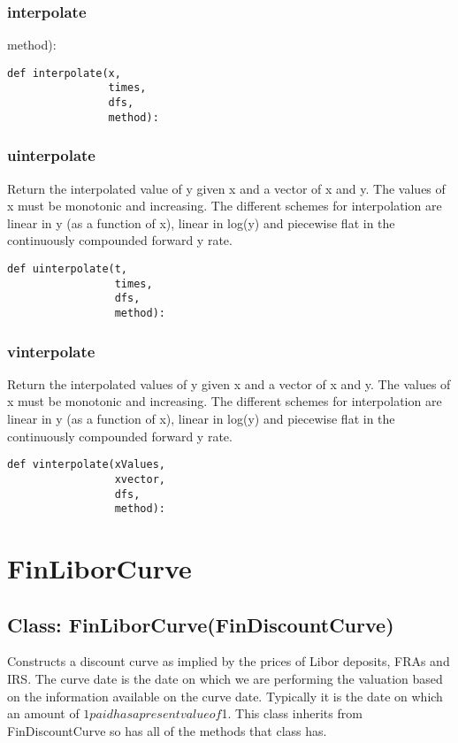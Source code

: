 \documentclass[twoside,11pt]{book}
\begin{document}
\subsubsection*{{\bf interpolate}}
method): 

\begin{lstlisting}
def interpolate(x,
                times,
                dfs,
                method):
\end{lstlisting}

\subsubsection*{{\bf uinterpolate}}
Return the interpolated value of y given x and a vector of x and y. The values of x must be monotonic and increasing. The different schemes for interpolation are linear in y (as a function of x), linear in log(y) and piecewise flat in the continuously compounded forward y rate.  

\begin{lstlisting}
def uinterpolate(t,
                 times,
                 dfs,
                 method):
\end{lstlisting}

\subsubsection*{{\bf vinterpolate}}
Return the interpolated values of y given x and a vector of x and y. The values of x must be monotonic and increasing. The different schemes for interpolation are linear in y (as a function of x), linear in log(y) and piecewise flat in the continuously compounded forward y rate.  

\begin{lstlisting}
def vinterpolate(xValues,
                 xvector,
                 dfs,
                 method):
\end{lstlisting}

\newpage
\section{FinLiborCurve}

\subsection*{Class: FinLiborCurve(FinDiscountCurve)}
Constructs a discount curve as implied by the prices of Libor  deposits, FRAs and IRS. The curve date is the date on which we are performing the valuation based on the information available on the curve date. Typically it is the date on which an amount of $1 paid has a present value of $1.  This class inherits from FinDiscountCurve so has all of the methods that class has.  
\end{document}
